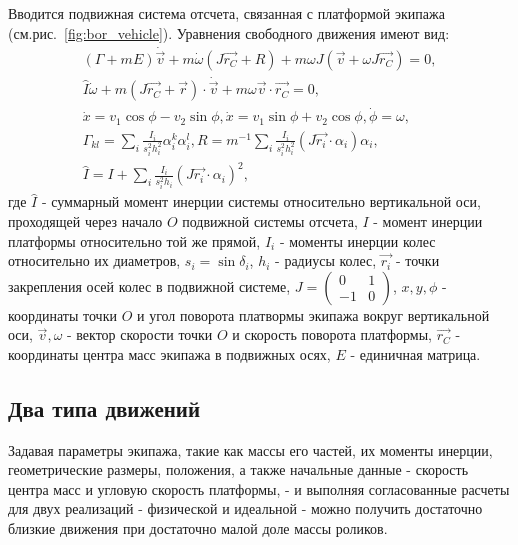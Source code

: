 Вводится подвижная система отсчета, связанная с платформой экипажа (см.рис.~\ref{fig:bor_vehicle}). Уравнения свободного движения имеют вид:
\begin{eqnarray*}
(\Gamma+mE)\dot{\vec{v}} + m\dot{\omega}(J\vec{r_C}+R)+m\omega J(\vec{v} + \omega J\vec{r_C}) = 0,\\
\hat{I}\dot{\omega} + m(J\vec{r_C}+\vec{r})\cdot\dot{\vec{v}}+m\omega\vec{v}\cdot\vec{r_C} = 0,\\
\dot{x} = v_1\cos\phi - v_2\sin\phi, \dot{x} = v_1\sin\phi + v_2\cos\phi, \dot{\phi} = \omega,\\
\Gamma_{kl} = \sum_i \frac{I_i}{s_i^2 h_i^2}\alpha_i^k\alpha_i^l, R = m^{-1}\sum_i \frac{I_i}{s_i^2 h_i^2}(J\vec{r_i}\cdot \alpha_i) \alpha_i,\\
\hat{I} = I + \sum_i \frac{I_i}{s_i^2 h_i}(J\vec{r_i}\cdot \alpha_i)^2,
\end{eqnarray*}%
\newline
где $\hat{I}$ - суммарный момент инерции системы относительно вертикальной оси, проходящей через начало $O$ подвижной системы отсчета,\newline
$I$ - момент инерции платформы относительно той же прямой,\newline
$I_i$ - моменты инерции колес относительно их диаметров,\newline
$s_i = \sin\delta_i$, $h_i$ - радиусы колес,\newline
$\vec{r_i}$ - точки закрепления осей колес в подвижной системе,\newline
$J = \left(\begin{array}{cc}0 & 1\\-1 & 0\end{array}\right)$,\newline
$x,y,\phi$ - координаты точки $O$ и угол поворота платвормы экипажа вокруг вертикальной оси,\newline
$\vec{v}, \omega$ - вектор скорости точки $O$ и скорость поворота платформы,\newline
$\vec{r_C}$ - координаты центра масс экипажа в подвижных осях,
$E$ - единичная матрица.\\



\subsection{Два типа движений}
Задавая параметры экипажа, такие как массы его частей, их моменты инерции, геометрические размеры, положения, а также начальные данные - скорость центра масс и угловую скорость платформы, - и выполняя согласованные расчеты для двух реализаций - физической и идеальной - можно получить достаточно близкие движения при достаточно малой доле массы роликов.\\

